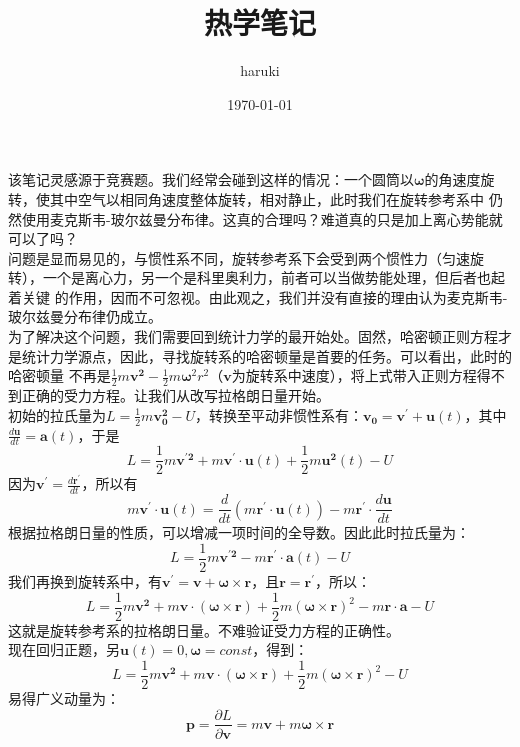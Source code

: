 \documentclass[utf8]{ctexart}
\title{热学笔记}
\author{haruki}
\date{\today}
\begin{document}
\maketitle
\noindent 该笔记灵感源于竞赛题。我们经常会碰到这样的情况：一个圆筒以$\boldsymbol{\omega}$的角速度旋转，使其中空气以相同角速度整体旋转，相对静止，此时我们在旋转参考系中
仍然使用麦克斯韦-玻尔兹曼分布律。这真的合理吗？难道真的只是加上离心势能就可以了吗？\\
问题是显而易见的，与惯性系不同，旋转参考系下会受到两个惯性力（匀速旋转），一个是离心力，另一个是科里奥利力，前者可以当做势能处理，但后者也起着关键
的作用，因而不可忽视。由此观之，我们并没有直接的理由认为麦克斯韦-玻尔兹曼分布律仍成立。\\
为了解决这个问题，我们需要回到统计力学的最开始处。固然，哈密顿正则方程才是统计力学源点，因此，寻找旋转系的哈密顿量是首要的任务。可以看出，此时的哈密顿量
不再是$\frac{1}{2}m\boldsymbol{v^2}-\frac{1}{2}m\boldsymbol{\omega} ^{2}r^2$（$\boldsymbol{v}$为旋转系中速度），将上式带入正则方程得不到正确的受力方程。让我们从改写拉格朗日量开始。\\
初始的拉氏量为$L=\frac{1}{2}m\boldsymbol{v_0^{2}}-U$，转换至平动非惯性系有：$\boldsymbol{v_0}=\boldsymbol{v^{'}}+\boldsymbol{u}(t)$，其中$\frac{d\boldsymbol{u}}{dt}=\boldsymbol{a}(t)$，于是
$$
L=\frac{1}{2}m\boldsymbol{v^{'2}}+m\boldsymbol{v^{'}}\cdot\boldsymbol{u}(t)+\frac{1}{2}m\boldsymbol{u^{2}}(t)-U
$$
因为$\boldsymbol{v^{'}}=\frac{d\boldsymbol{r^{'}}}{dt}$，所以有
$$
m\boldsymbol{v^{'}}\cdot\boldsymbol{u}(t)=\frac{d}{dt}(m\boldsymbol{r^{'}}\cdot\boldsymbol{u}(t))-m\boldsymbol{r^{'}}\cdot\frac{d\boldsymbol{u}}{dt}
$$
根据拉格朗日量的性质，可以增减一项时间的全导数。因此此时拉氏量为：
$$
L=\frac{1}{2}m\boldsymbol{v^{'2}}-m\boldsymbol{r^{'}}\cdot\boldsymbol{a}(t)-U
$$
我们再换到旋转系中，有$\boldsymbol{v^{'}}=\boldsymbol{v}+\boldsymbol{\omega}\times\boldsymbol{r}$，且$\boldsymbol{r}=\boldsymbol{r^{'}}$，所以：
$$
L=\frac{1}{2}m\boldsymbol{v^{2}}+m\boldsymbol{v}\cdot(\boldsymbol{\omega}\times\boldsymbol{r})+\frac{1}{2}m(\boldsymbol{\boldsymbol{\omega}\times\boldsymbol{r}})^2-m\boldsymbol{r}\cdot\boldsymbol{a}-U
$$
这就是旋转参考系的拉格朗日量。不难验证受力方程的正确性。\\
现在回归正题，另$\boldsymbol{u}(t)=0,\boldsymbol{\omega}=const$，得到：
$$
L=\frac{1}{2}m\boldsymbol{v^{2}}+m\boldsymbol{v}\cdot(\boldsymbol{\omega}\times\boldsymbol{r})+\frac{1}{2}m(\boldsymbol{\boldsymbol{\omega}\times\boldsymbol{r}})^2-U
$$
易得广义动量为：
$$
\boldsymbol{p}=\frac{\partial L}{\partial \boldsymbol{v}}=m\boldsymbol{v}+m\boldsymbol{\omega}\times\boldsymbol{r}
$$
\end{document}
